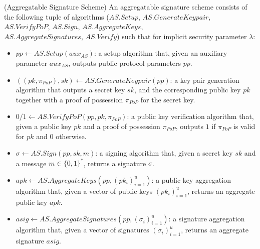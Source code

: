 \begin{definition}
\label{def:aggregate_signatures}
(Aggregatable Signature Scheme) An aggregatable signature scheme consists of
the following tuple of algorithms ($\mathit{AS.Setup}$, $\mathit{AS.GenerateKeypair}$, $\mathit{AS.VerifyPoP}$, 
$\mathit{AS.Sign}$, $\mathit{AS.AggregateKeys}$, \\ $\mathit{AS.AggregateSignatures}$, $\mathit{AS.Verify}$) 
such that for implicit security parameter $\lambda$:
\vspace{-0.05in}
\begin{itemize}

\item $\mathit{pp} \leftarrow  \mathit{AS.Setup}(\mathit{aux_{\mathit{AS}}})$: a setup algorithm that, given an 
auxiliary parameter $\mathit{aux_{\mathit{AS}}}$, outputs public protocol parameters $\mathit{pp}$. 

\item $((\mathit{pk},\mathit{\pi_{PoP}}),\mathit{sk}) \leftarrow \mathit{AS.GenerateKeypair}(\mathit{pp})$:
a key pair generation algorithm that
outputs
a secret key $\mathit{sk}$,
and the corresponding public key $\mathit{pk}$
together with a proof of possession $\mathit{\pi_{PoP}}$ for the secret key.

\item $0/1 \leftarrow \mathit{AS.VerifyPoP}(\mathit{pp}, \mathit{pk},\mathit{\pi_{PoP}})$:
a public key verification algorithm that,
given a public key $\mathit{pk}$
and a proof of possession $\mathit{\pi_{PoP}}$,
outputs
$1$ if $\mathit{\pi_{PoP}}$ is valid for $\mathit{pk}$ and $0$ otherwise.

\item $\sigma \leftarrow \mathit{AS.Sign}(\mathit{pp}, \mathit{sk}, m)$:
a signing algorithm that,
given a secret key $\mathit{sk}$ and a message $m \in \{0, 1\}^*$, returns a signature $\sigma$.

\item $\mathit{apk} \leftarrow \mathit{AS.AggregateKeys}(\mathit{pp}, (\mathit{pk_i})_{i=1}^{u})$:
a public key aggregation algorithm that,
given a vector of public keys $(\mathit{pk_i})_{i=1}^u$,
returns
an aggregate public key $\mathit{apk}$.

\item $\mathit{asig} \leftarrow \mathit{AS.AggregateSignatures}(\mathit{pp}, (\sigma_i)_{i=1}^u)$:
a signature aggregation algorithm that,
given a vector of signatures $(\sigma_i)_{i=1}^u$,
returns
an aggregate signature $\mathit{asig}$.


\end{itemize}
\end{definition}
